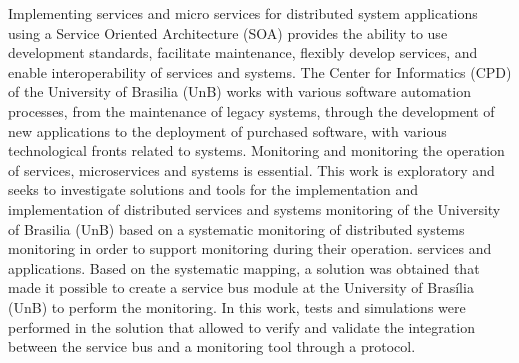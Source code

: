 Implementing services and micro services for distributed system applications using a Service Oriented Architecture (SOA) provides the ability to use development standards, facilitate maintenance, flexibly develop services, and enable interoperability of services and systems. The Center for Informatics (CPD) of the University of Brasilia (UnB) works with various software automation processes, from the maintenance of legacy systems, through the development of new applications to the deployment of purchased software, with various technological fronts related to systems. Monitoring and monitoring the operation of services, microservices and systems is essential. This work is exploratory and seeks to investigate solutions and tools for the implementation and implementation of distributed services and systems monitoring of the University of Brasilia (UnB) based on a systematic monitoring of distributed systems monitoring in order to support monitoring during their operation. services and applications. Based on the systematic mapping, a solution was obtained that made it possible to create a service bus module at the University of Brasília (UnB) to perform the monitoring. In this work, tests and simulations were performed in the solution that allowed to verify and validate the integration between the service bus and a monitoring tool through a protocol.